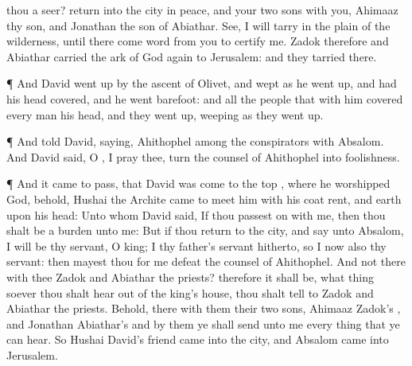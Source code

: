 {{} thou a
seer?
return into the
city in
peace, and your
two
sons with you,
Ahimaaz thy
son, and
Jonathan the
son of
Abiathar.
See, I will
tarry in the
plain of the
wilderness, until there
come
word from you to
certify me.
Zadok therefore and
Abiathar
carried the
ark of
God
again to
Jerusalem: and they
tarried there.
\par }{\PP {}¶ And
David went
up by the
ascent of
{}
Olivet, and
wept as he went
up, and had his
head
covered, and he
went
barefoot: and all the
people that
{} with him
covered every
man his
head, and they went
up,
weeping as they went
up.
\par }{\PP {}¶ And
{}
told
David,
saying,
Ahithophel
{} among the
conspirators with
Absalom. And
David
said, O
{}, I pray thee, turn the
counsel of
Ahithophel into
foolishness.
\par }{\PP {}¶ And it came to pass, that
{}
David was
come to the
top
{}, where he
worshipped
God, behold,
Hushai the
Archite came to
meet him with his
coat
rent, and
earth upon his
head:
Unto whom
David
said, If thou passest
on with me, then thou shalt be a
burden unto me:
But if thou
return to the
city, and
say unto
Absalom, I will be thy
servant, O
king;
{} I
{} thy
father’s
servant
hitherto, so
{} I now also
{} thy
servant: then mayest thou for me
defeat the
counsel of
Ahithophel.
And
{} not there with thee
Zadok and
Abiathar the
priests? therefore it shall be,
{} what
thing soever thou shalt
hear out of the
king’s
house, thou shalt
tell
{} to
Zadok and
Abiathar the
priests.
Behold,
{} there with them their
two
sons,
Ahimaaz
Zadok’s
{}, and
Jonathan
Abiathar’s
{} and by
them ye shall
send unto me every
thing that ye can
hear.
So
Hushai
David’s
friend
came into the
city, and
Absalom
came into
Jerusalem.

}
